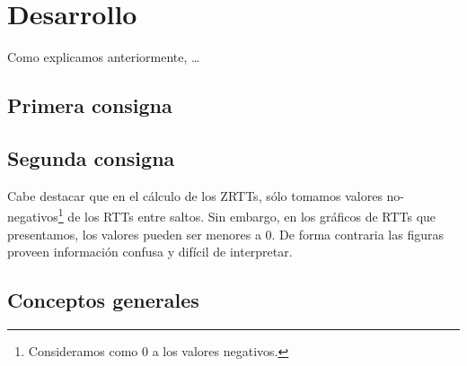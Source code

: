 \section{Desarrollo}

\PARstart Como explicamos anteriormente, \ldots


\subsection{Primera consigna}

\subsection{Segunda consigna}

\par Cabe destacar que en el cálculo de los ZRTTs, sólo tomamos valores no-negativos\footnote{Consideramos como 0 a los valores negativos.} de los RTTs entre saltos. 
Sin embargo, en los gráficos de RTTs que presentamos, los valores pueden ser menores a 0.
De forma contraria las figuras proveen información confusa y difícil de interpretar.

\subsection{Conceptos generales}
